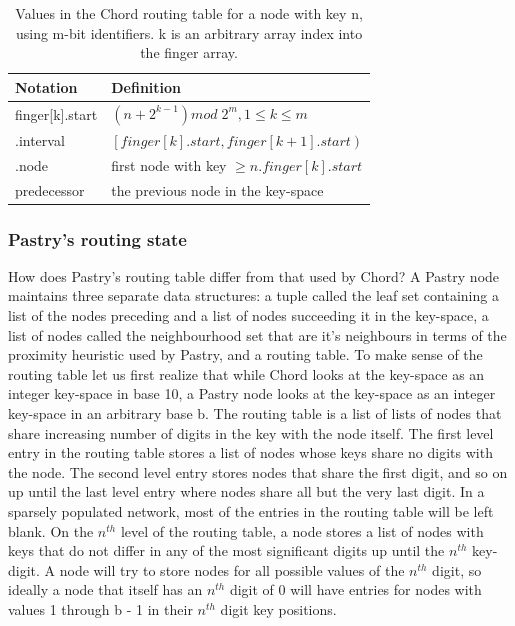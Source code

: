 \begin{table}[h]
\caption{Values in the Chord routing table for a node with key n, using m-bit identifiers. k is an arbitrary array index into the finger array.}
\begin{center}
\begin{tabular}{ | l | l | }
  \hline                       
  Notation & Definition \\
  \hline  
  \hline  
  finger[k].start & $\left( n + 2^{k - 1} \right) mod \; 2^{m} , 1 \leq k \leq m $ \\
  \hline  
  \;.interval & $ \left[ finger[k].start, finger[k+1].start \right) $ \\
  \hline  
  \;.node & first node with key $ \geq n.finger[k].start $ \\
  \hline  
  predecessor & the previous node in the key-space \\
  \hline  
\end{tabular}
\end{center}
\label{tableChordRoutingTable}
\end{table}


\subsubsection{Pastry's routing state}
\label{sec:pastryRoutingState}
How does Pastry's routing table differ from that used by Chord?
A Pastry node maintains three separate data structures: a tuple called the leaf set containing a list of the nodes preceding and a list of nodes succeeding it in the key-space, a list of nodes called the neighbourhood set that are it's neighbours in terms of the proximity heuristic used by Pastry, and a routing table. 
To make sense of the routing table let us first realize that while Chord looks at the key-space as an integer key-space in base 10, a Pastry node looks at the key-space as an integer key-space in an arbitrary base b.
The routing table is a list of lists of nodes that share increasing number of digits in the key with the node itself. The first level entry in the routing table stores a list of nodes whose keys share no digits with the node. The second level entry stores nodes that share the first digit, and so on up until the last level entry where nodes share all but the very last digit.
In a sparsely populated network, most of the entries in the routing table will be left blank.
On the $ n^{th} $ level of the routing table, a node stores a list of nodes with keys that do not differ in any of the most significant digits up until the $ n^{th} $ key-digit.
A node will try to store nodes for all possible values of the $ n^{th} $ digit, so ideally a node that itself has an $ n^{th} $ digit of 0 will have entries for nodes with values 1 through b - 1 in their $ n^{th} $ digit key positions.

